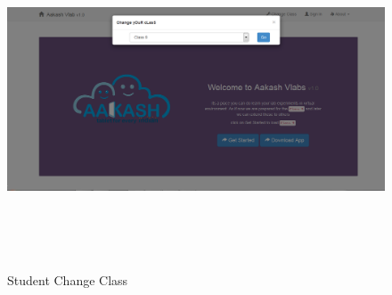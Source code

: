 \documentclass[12pt]{report}
\begin{document}
\begin{figure}[H]
 \centering 
 \includegraphics[width=15cm, height=10cm]{./315.jpg}
 \caption{Student Change Class\label{fig:315}}
\end{figure}
\end{document}
